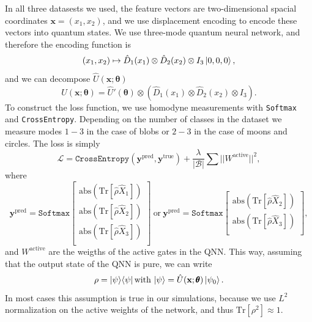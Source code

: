 \documentclass[12pt, a4paper,  nobibnotes]{article}
\newcommand{\op}[1]{\hat{#1}}
\newcommand{\ketbra}[2]{|#1\rangle\langle#2|}
\newcommand{\Tr}[1]{\mathrm{Tr}\left[#1\right]}
\begin{document}
In all three datasests we used, the feature vectors are two-dimensional spacial coordinates
$\mathbf x = (x_1,x_2)$, and we use displacement encoding to encode these vectors into quantum states.
We use three-mode quantum neural network, and therefore the encoding function is 
\begin{equation}
    (x_1, x_2) \mapsto \op D_1(x_1)\otimes\op D_2(x_2)\otimes I_3 \ket{0,0,0},
\end{equation}
and we can decompose $\op U(\mathbf x; \pmb\theta)$
\begin{equation}
    \op U(\mathbf x; \pmb\theta) = \op U'(\pmb\theta)\otimes \left(\op D_1(x_1)\otimes\op D_2(x_2)\otimes I_3\right).
\end{equation}
To construct the loss function, we use homodyne measurements with \texttt{Softmax} and \texttt{CrossEntropy}.
Depending on the number of classes in the dataset we measure modes $1-3$ in the case of blobs
or $2-3$ in the case of moons and circles.
The loss is simply
\begin{equation}
    \mathcal L =  \texttt{CrossEntropy}(\mathbf y^{\textrm{pred}}, \mathbf y^{\textrm{true}}) + \frac{\lambda}{|\mathcal B|}\sum||W^{\textrm{active}}||^2,
\end{equation}
where
\begin{equation}
    \mathbf y^{\textrm{pred}} = \texttt{Softmax}\begin{bmatrix}
        \textrm{abs}\left(\Tr{\op\rho \op X_1}\right) \\[6.5pt]
        \textrm{abs}\left(\Tr{\op\rho \op X_2}\right) \\[6.5pt]
        \textrm{abs}\left(\Tr{\op\rho \op X_3}\right) \\[6.5pt]
    \end{bmatrix}~\textrm{or}~
    \mathbf y^{\textrm{pred}} = \texttt{Softmax}\begin{bmatrix}
        \textrm{abs}\left(\Tr{\op\rho \op X_2}\right) \\[6.5pt]
        \textrm{abs}\left(\Tr{\op\rho \op X_3}\right) \\[6.5pt]
    \end{bmatrix},
\end{equation}
and $W^{\textrm{active}}$ are the weigths of the active gates in the QNN. 
This way, assuming that the output state of the QNN is pure, we can write
\begin{equation}
    \rho = \ketbra{\psi}{\psi}\, \textrm{with}\, \ket\psi = \op U(\mathbf x; \pmb\theta)\ket{\psi_0}.
\end{equation}
In most cases this assumption is true in our simulations, because we use $L^2$ normalization
on the active weights of the network, and thus $\Tr{\rho^2}\approx 1$.
\end{document}
